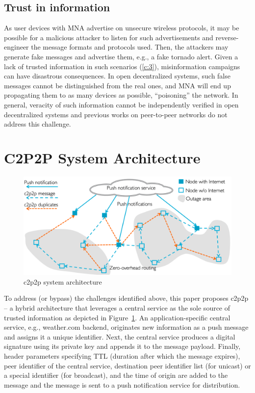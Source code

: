 \documentclass[conference]{IEEEtran}
\begin{document}
\subsection{Trust in information}
%
As user devices with MNA advertise on unsecure wireless protocols, it
may be possible for a malicious attacker to listen for such
advertisements and reverse-engineer the message formats and protocols
used. Then, the attackers may generate fake messages and advertise
them, e.g., a fake tornado alert. Given a lack of trusted information
in such scenarios (\ref{c:3}), misinformation campaigns can have
disastrous consequences.  In open decentralized systems, such false
messages cannot be distinguished from the real ones, and MNA will end
up propagating them to as many devices as possible, ``poisoning'' the
network. In general, veracity of such information cannot be
independently verified in open decentralized systems and previous works
on peer-to-peer networks do not address this challenge.
%
\section{C2P2P System Architecture}
\label{sec:architecture}
%
\begin{figure}[htbp]
\centerline{\includegraphics[width=\columnwidth]{figs/arch}}
\caption{c2p2p system architecture}
\label{fig:arch}
\end{figure}

To address (or bypass) the challenges identified above, this paper
proposes c2p2p -- a hybrid architecture that leverages a central
service as the sole source of trusted information as depicted in
Figure~\ref{fig:arch}. An application-specific central service, e.g.,
weather.com backend, originates new information as a push message and
assigns it a unique identifier. Next, the central service produces a
digital signature using its private key and appends it to the message
payload. Finally, header parameters specifying TTL (duration after
which the message expires), peer identifier of the central service,
destination peer identifier list (for unicast) or a special identifier
(for broadcast), and the time of origin are added to the message and
the message is sent to a push notification service for distribution.
\end{document}

